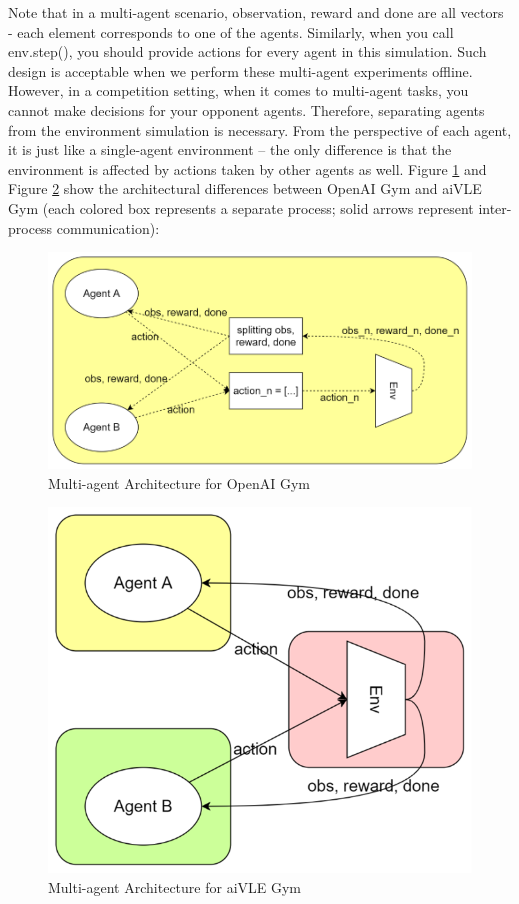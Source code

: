 \documentclass[fyp]{socreport}
\begin{document}
Note that in a multi-agent scenario, observation, reward and done are all vectors - each element corresponds to one of the agents. Similarly, when you call env.step(), you should provide actions for every agent in this simulation. Such design is acceptable when we perform these multi-agent experiments offline. However, in a competition setting, when it comes to multi-agent tasks, you cannot make decisions for your opponent agents. Therefore, separating agents from the environment simulation is necessary. From the perspective of each agent, it is just like a single-agent environment – the only difference is that the environment is affected by actions taken by other agents as well. Figure \ref{fig:opanai-gym-multi-arch} and Figure \ref{fig:aivle-gym-multi-arch} show the architectural differences between OpenAI Gym and aiVLE Gym (each colored box represents a separate process; solid arrows represent inter-process communication):
\begin{figure}[H]
    \centering
    \includegraphics{images/opanai-gym-multi-arch.png}
    \caption{Multi-agent Architecture for OpenAI Gym}
    \label{fig:opanai-gym-multi-arch}
\end{figure}
\begin{figure}[H]
    \centering
    \includegraphics{images/aivle-gym-multi-arch.png}
    \caption{Multi-agent Architecture for aiVLE Gym}
    \label{fig:aivle-gym-multi-arch}
\end{figure}
\end{document}
